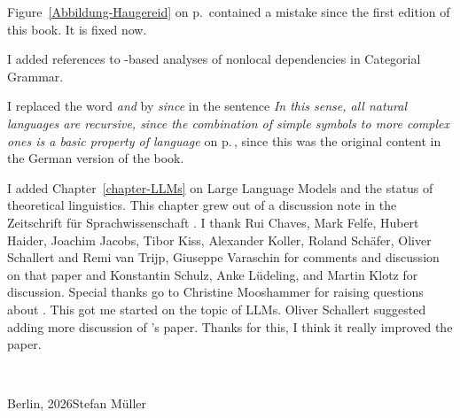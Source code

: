 %


Figure~\ref{Abbildung-Haugereid} on p.\,\pageref{Abbildung-Haugereid} contained a mistake since the first edition of this book. It is fixed now.

I added references to \slasch-based analyses of nonlocal dependencies in Categorial Grammar.





I replaced the word \emph{and} by \emph{since} in the sentence \emph{In this sense, all natural
  languages are recursive, since the combination of simple symbols to more complex ones is a basic
  property of language \citep[]{Hockett60a}} on p.\,\pageref{page-hockett}, since this was the original content in the
  German version of the book.



I added Chapter~\ref{chapter-LLMs} on Large Language Models and the status of theoretical
linguistics. This chapter grew out of a discussion note in the Zeitschrift für Sprachwissenschaft
\citep{MuellerLLMs}. I thank Rui Chaves, Mark Felfe, Hubert Haider, Joachim Jacobs, Tibor Kiss,
Alexander Koller, Roland 
Schäfer, Oliver Schallert and Remi van Trijp, Giuseppe
Varaschin for comments and discussion on that paper and Konstantin Schulz, Anke Lüdeling, and Martin Klotz for 
discussion. Special thanks go to Christine Mooshammer for raising questions about
. This got me started on the topic of LLMs.
Oliver Schallert suggested adding more discussion of \citeauthor{Piantadosi2024a}'s paper. Thanks
for this, I think it really improved the paper.


~\medskip

\noindent
Berlin, 2026\hfill Stefan Müller



